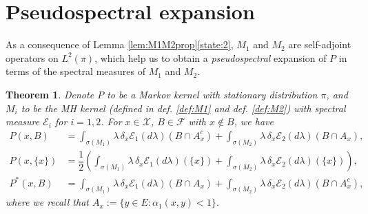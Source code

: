 \documentclass[12pt,a4]{amsart}
\numberwithin{equation}{section}
\theoremstyle{plain}
\newtheorem{theorem}{Theorem}[section]
\theoremstyle{definition}
\theoremstyle{remark}
\newcommand{\1}{\mathds{1}}
\begin{document}
\section{Pseudospectral expansion}\label{sec:pseexp}
As a consequence of Lemma \ref{lem:M1M2prop}\ref{state:2}, $M_1$ and $M_2$ are self-adjoint operators on $L^2(\pi)$, which help us to obtain a \textit{pseudospectral} expansion of $P$ in terms of the spectral measures of $M_1$ and $M_2$.

\begin{theorem}\label{thm:pseexp}
	Denote $P$ to be a Markov kernel with stationary distribution $\pi$, and $M_i$ to be the MH kernel (defined in def. \ref{def:M1} and def. \ref{def:M2}) with spectral measure $\mathcal{E}_i$ for $i= 1,2$. For $x \in \mathcal{X}$, $B \in \mathcal{F}$ with $x \notin B$, we have
	\begin{align}
		P(x,B) &= \int_{\sigma(M_1)} \lambda \, \delta_x \mathcal{E}_1(d \lambda) (B \cap A_x^c) +  \int_{\sigma(M_2)} \lambda \, \delta_x \mathcal{E}_2(d \lambda) (B \cap A_x), \label{eq:psexB}\\
		P(x,\{x\}) &= \dfrac{1}{2} \left( \int_{\sigma(M_1)} \lambda \, \delta_x \mathcal{E}_1(d \lambda) (\{x\} ) + \int_{\sigma(M_2)} \lambda \, \delta_x \mathcal{E}_2(d \lambda) (\{x\}) \right) \label{eq:psexx}, \\
		P^*(x,B) &= \int_{\sigma(M_1)} \lambda \, \delta_x \mathcal{E}_1(d \lambda) (B \cap A_x) + \int_{\sigma(M_2)} \lambda \, \delta_x \mathcal{E}_2(d \lambda) (B \cap A_x^c), \label{eq:p*sexB}	
	\end{align}
	where we recall that $A_x := \{y \in E : \alpha_1(x,y) < 1\}$.
\end{theorem}
\end{document}
